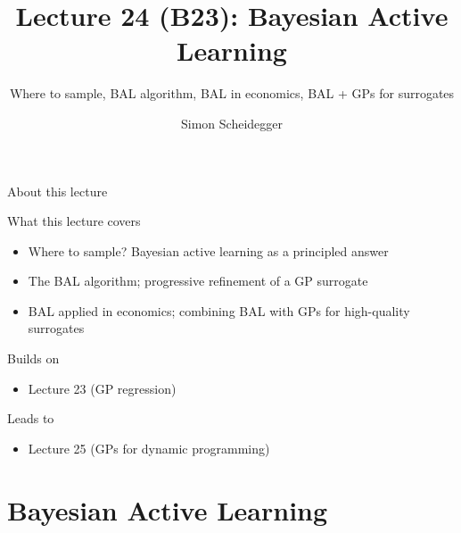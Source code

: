 \documentclass[aspectratio=169,11pt]{beamer}
\title[Lecture 24 (B23)]{Lecture 24 (B23): Bayesian Active Learning}
\subtitle{Where to sample, BAL algorithm, BAL in economics, BAL + GPs for surrogates}
\author{Simon Scheidegger}
\institute{HEC, University of Lausanne}
\date{}
\begin{document}
\providecommand{\exercisepause}{%
  \tikz[baseline=(X.base)]{\node[fill=darkgreen!80!black, text=white,
  rounded corners=2pt, inner sep=3pt, font=\scriptsize\bfseries](X){PAUSE};}}

{
\begin{frame}
\titlepage
\end{frame}
}

\begin{frame}{About this lecture}
\small
\begin{block}{What this lecture covers}
\begin{itemize}\itemsep2pt
  \item Where to sample? Bayesian active learning as a principled answer
  \item The BAL algorithm; progressive refinement of a GP surrogate
  \item BAL applied in economics; combining BAL with GPs for high-quality surrogates
\end{itemize}
\end{block}
\begin{block}{Builds on}
\begin{itemize}\itemsep2pt
  \item Lecture 23 (GP regression)
\end{itemize}
\end{block}
\begin{block}{Leads to}
\begin{itemize}\itemsep2pt
  \item Lecture 25 (GPs for dynamic programming)
\end{itemize}
\end{block}
\end{frame}

\section{Bayesian Active Learning}
\end{document}
